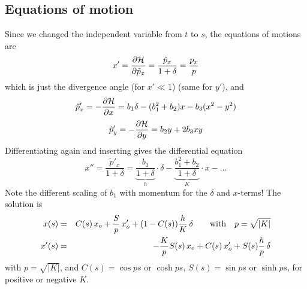 \documentclass[12pt]{article}
\newcommand\beq{\begin{equation}}
\newcommand\eeq{\end{equation}}
\begin{document}
\subsection{Equations of motion}
Since we changed the independent variable from $t$ to $s$, the equations of motions are
\beq
x'=\frac{\partial {\cal H}}{\partial \tilde{p}_x}= \frac{\tilde{p}_x}{1+\delta}=\frac{p_x}{p}
\eeq
which is just the divergence angle (for $x'\ll 1$) (same for $y'$), and
\beq
\tilde{p}_x'=-\frac{\partial {\cal H}}{\partial x} = b_1\delta -(b_1^2+b_2)x - b_3(x^2-y^2)
\eeq
\beq
\tilde{p}_y'=-\frac{\partial {\cal H}}{\partial y} = b_2 y + 2b_3 xy
\eeq
Differentiating again and inserting gives the differential equation
\beq
x''= \frac{\tilde{p}'_x}{1+\delta} = \underbrace{\frac{b_1}{1+\delta}}_{h}\cdot\delta - \underbrace{\frac{b_1^2+b_2}{1+\delta}}_{K}\cdot x - \dots
\eeq
Note the different scaling of $b_1$ with momentum for the $\delta$ and $x$-terms! The solution is
\begin{eqnarray}
\label{eq:eqmo}
x(s) & = & C(s)\,x_o +  \frac{S}{p}\,x_o'  + (1-C(s))\frac{h}{K}\,\delta
\qquad \mbox{\rm with}\quad p=\sqrt{|K|} \\
x'(s) & = & -\frac{K}{p}S(s)\, x_o + C(s)\, x_o' + S(s)\frac{h}{p}\,\delta \nonumber
\end{eqnarray}
with $p=\sqrt{|K|}$, and $C(s)=\cos ps$ or $\cosh ps$, $S(s)=\sin ps$ or $\sinh ps$, for positive or negative $K$.
\end{document}
